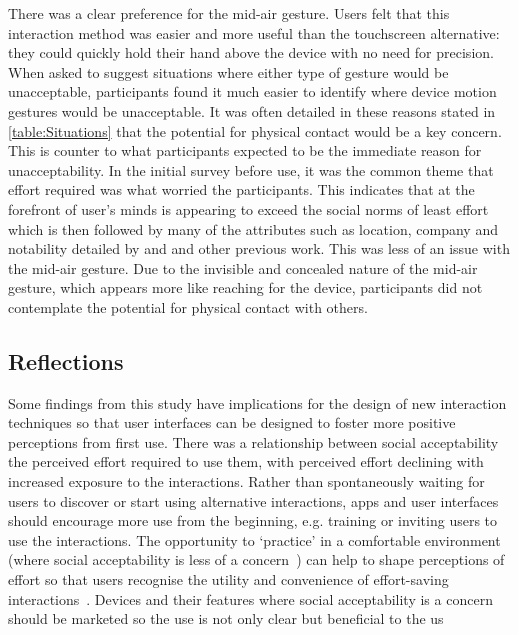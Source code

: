 \documentclass{l4proj}
\begin{document}
There was a clear preference for the mid-air gesture. Users felt that this interaction method was easier and more useful than the touchscreen alternative: they could quickly hold their hand above the device with no need for precision. When asked to suggest situations where either type of gesture would be unacceptable, participants found it much easier to identify where device motion gestures would be unacceptable. It was often detailed in these reasons stated in \autoref{table:Situations} that the potential for physical contact would be a key concern. This is counter to what participants expected to be the immediate reason for unacceptability. In the initial survey before use, it was the common theme that effort required was what worried the participants. This indicates that at the forefront of user’s minds is appearing to exceed the social norms of least effort which is then followed by many of the attributes such as location, company and notability detailed by \citet{rico_usable_2010} and \citet{pohl_focused_2013} and other previous work. This was less of an issue with the mid-air gesture. Due to the invisible and concealed nature of the mid-air gesture, which appears more like reaching for the device, participants did not contemplate the potential for physical contact with others.

\subsection{Reflections}

Some findings from this study have implications for the design of new interaction techniques so that user interfaces can be designed to foster more positive perceptions from first use. There was a relationship between social acceptability the perceived effort required to use them, with perceived effort declining with increased exposure to the interactions. Rather than spontaneously waiting for users to discover or start using alternative interactions, apps and user interfaces should encourage more use from the beginning, e.g. training or inviting users to use the interactions. The opportunity to `practice' in a comfortable environment (where social acceptability is less of a concern~\citet{rico_usable_2010}) can help to shape perceptions of effort so that users recognise the utility and convenience of effort-saving interactions~\citet{pohl_focused_2013}. Devices and their features where social acceptability is a concern should  be marketed so the use is not only clear but beneficial to the us
\end{document}
